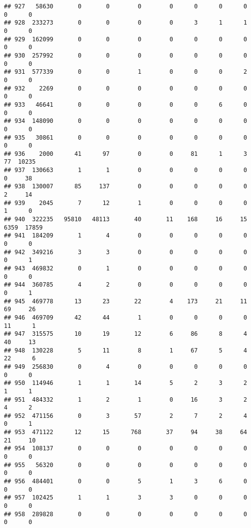 \documentclass[
]{article}
\begin{document}
\begin{verbatim}
## 927   58630       0       0        0        0      0      0      0     0      0
## 928  233273       0       0        0        0      3      1      1     0      0
## 929  162099       0       0        0        0      0      0      0     0      0
## 930  257992       0       0        0        0      0      0      0     0      0
## 931  577339       0       0        1        0      0      0      2     0      0
## 932    2269       0       0        0        0      0      0      0     0      0
## 933   46641       0       0        0        0      0      6      0     0      0
## 934  148090       0       0        0        0      0      0      0     0      0
## 935   30861       0       0        0        0      0      0      0     0      0
## 936    2000      41      97        0        0     81      1      3    77  10235
## 937  130663       1       1        0        0      0      0      0     0     38
## 938  130007      85     137        0        0      0      0      0     2     14
## 939    2045       7      12        1        0      0      0      0     1      0
## 940  322235   95810   48113       40       11    168     16     15  6359  17859
## 941  184209       1       4        0        0      0      0      0     0      0
## 942  349216       3       3        0        0      0      0      0     0      1
## 943  469832       0       1        0        0      0      0      0     0      0
## 944  360785       4       2        0        0      0      0      0     0      1
## 945  469778      13      23       22        4    173     21     11    69     26
## 946  469709      42      44        1        0      0      0      0    11      1
## 947  315575      10      19       12        6     86      8      4    40     13
## 948  130228       5      11        8        1     67      5      4    22      6
## 949  256830       0       4        0        0      0      0      0     0      0
## 950  114946       1       1       14        5      2      3      2     1      1
## 951  484332       1       2        1        0     16      3      2     4      2
## 952  471156       0       3       57        2      7      2      4     0      1
## 953  471122      12      15      768       37     94     38     64    21     10
## 954  108137       0       0        0        0      0      0      0     0      0
## 955   56320       0       0        0        0      0      0      0     0      0
## 956  484401       0       0        5        1      3      6      0     0      0
## 957  102425       1       1        3        3      0      0      0     0      0
## 958  289828       0       0        0        0      0      0      0     0      0

\end{verbatim}
\end{document}
